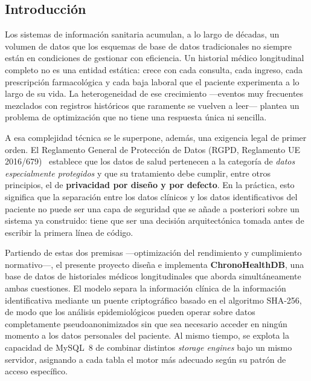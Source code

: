\documentclass[../main.tex]{subfiles}
\begin{document}
\subsection{Introducción}

Los sistemas de información sanitaria acumulan, a lo largo de décadas, un volumen de datos que los esquemas de base de datos tradicionales no siempre están en condiciones de gestionar con eficiencia. Un historial médico longitudinal completo no es una entidad estática: crece con cada consulta, cada ingreso, cada prescripción farmacológica y cada baja laboral que el paciente experimenta a lo largo de su vida. La heterogeneidad de ese crecimiento —eventos muy frecuentes mezclados con registros históricos que raramente se vuelven a leer— plantea un problema de optimización que no tiene una respuesta única ni sencilla.

A esa complejidad técnica se le superpone, además, una exigencia legal de primer orden. El Reglamento General de Protección de Datos (RGPD, Reglamento UE 2016/679)~\cite{rgpd2016} establece que los datos de salud pertenecen a la categoría de \textit{datos especialmente protegidos} y que su tratamiento debe cumplir, entre otros principios, el de \textbf{privacidad por diseño y por defecto}. En la práctica, esto significa que la separación entre los datos clínicos y los datos identificativos del paciente no puede ser una capa de seguridad que se añade a posteriori sobre un sistema ya construido: tiene que ser una decisión arquitectónica tomada antes de escribir la primera línea de código.

Partiendo de estas dos premisas —optimización del rendimiento y cumplimiento normativo—, el presente proyecto diseña e implementa \textbf{ChronoHealthDB}, una base de datos de historiales médicos longitudinales que aborda simultáneamente ambas cuestiones. El modelo separa la información clínica de la información identificativa mediante un puente criptográfico basado en el algoritmo SHA-256, de modo que los análisis epidemiológicos pueden operar sobre datos completamente pseudoanonimizados sin que sea necesario acceder en ningún momento a los datos personales del paciente. Al mismo tiempo, se explota la capacidad de MySQL~8 de combinar distintos \textit{storage engines} bajo un mismo servidor, asignando a cada tabla el motor más adecuado según su patrón de acceso específico.
\end{document}
